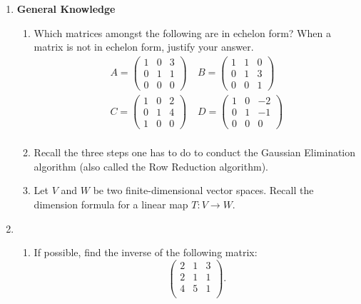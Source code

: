 \documentclass{article}
\begin{document}
\begin{enumerate}
\item \textbf{General Knowledge}
\begin{enumerate}
\item Which matrices amongst the following are in echelon form? When a matrix is not in echelon form, justify your answer.
 \[\begin{split}
 A =\begin{pmatrix} 1 & 0 & 3 \\ 0 & 1 & 1 \\ 0 & 0 & 0 \end{pmatrix} & \  B =\begin{pmatrix} 1 & 1 & 0 \\ 0 & 1 & 3 \\ 0 & 0 & 1 \end{pmatrix} \\
C =\begin{pmatrix} 1 & 0 & 2 \\ 0 & 1 & 4 \\ 1 & 0 & 0 \end{pmatrix}  & \  D =\begin{pmatrix} 1 & 0 & -2 \\ 0 & 1 & -1 \\ 0 & 0 & 0 \end{pmatrix} \\
\end{split}\]

\vskip 1in

\item Recall the three steps one has to do to conduct the Gaussian Elimination algorithm (also called the Row Reduction algorithm). 

\vskip 3in

\item Let $V$ and $W$ be two finite-dimensional vector spaces. Recall the dimension formula for a linear map $T: V \rightarrow W$.
\end{enumerate}




\newpage

\item 
\begin{enumerate}
\item If possible, find the inverse of the following matrix:
\[\begin{pmatrix}
2 & 1 & 3 \\
2 & 1 & 1 \\
4 & 5 & 1 \\
\end{pmatrix}.\]


\end{enumerate}
\end{enumerate}
\end{document}
